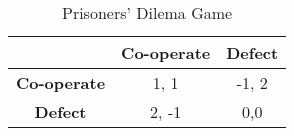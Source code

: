 \begin{table}[!htb]
\centering 
\begin{tabular}{c|cc}
\hline
	 & \textbf{Co-operate} & \textbf{Defect} \\ 
\hline
\textbf{Co-operate} 	& 1, 1 	& -1, 2  	\\
 \textbf{Defect} 		& 2, -1 	& 0,0		\\
\hline 
\end{tabular}

\caption{Prisoners' Dilema Game} 
\label{tab:prisoners_dilema}
\end{table}